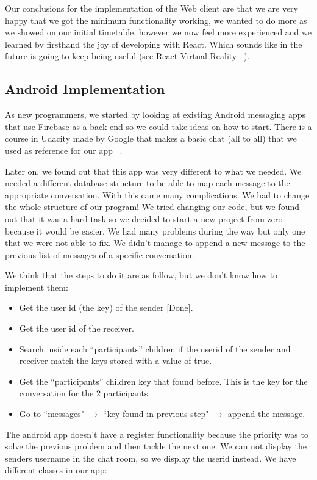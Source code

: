 Our conclusions for the implementation of the Web client are that we are very happy that we got the minimum functionality working, we wanted to do more as we showed on our initial timetable, however we now feel more experienced and we learned by firsthand the joy of developing with React. Which sounds like in the future is going to keep being useful (see React Virtual Reality ~\cite{4545etet}).


\subsection{Android Implementation}

As new programmers, we started by looking at existing Android messaging apps that use Firebase as a back-end so we could take ideas on how to start. There is a course in Udacity made by Google that makes a basic chat (all to all) that we used as reference for our app ~\cite{4664rtyrtr67}.

Later on, we found out that this app was very different to what we needed. We needed a different database structure to be able to map each message to the appropriate conversation. With this came many complications. We had to change the whole structure of our program! We tried changing our code, but we found out that it was a hard task so we decided to start a new project from zero because it would be easier.
We had many problems during the way but only one that we were not able to fix. We didn't manage to append a new message to the previous list of messages of a specific conversation.

We think that the steps to do it are as follow, but we don’t know how to implement them:

\begin{itemize}
	\item Get the user id (the key) of the sender [Done].
	\item Get the user id of the receiver.
	\item Search inside each “participants” children if the userid of the sender and receiver match the keys stored with a value of true.
	\item Get the “participants” children key that found before. This is the key for the conversation for the 2 participants.
	\item Go to ``messages" $\rightarrow$ ``key-found-in-previous-step" $\rightarrow$ append the message.
\end{itemize}

The android app doesn't have a register functionality because the priority was to solve the previous problem and then tackle the next one. We can not display the senders username in the chat room, so we display the userid instead.
We have different classes in our app:

